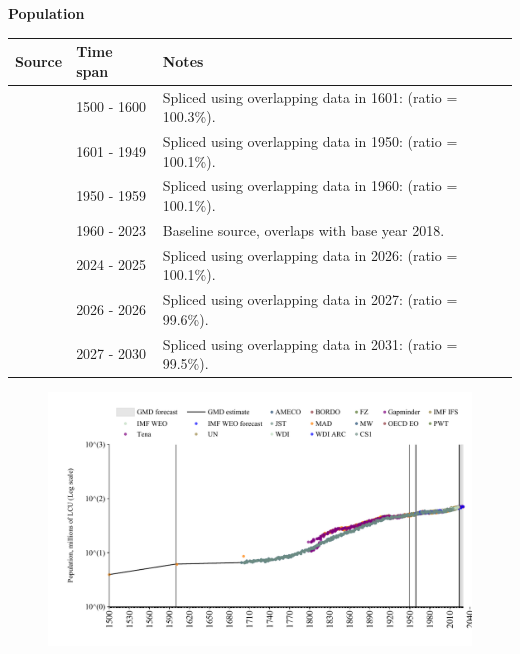 \documentclass[12pt,a4paper,landscape]{article}
\begin{document}
\begin{adjustbox}{max totalsize={\paperwidth}{\paperheight},center}
\begin{minipage}[t][\textheight][t]{\textwidth}
\vspace*{0.5cm}
{}
\begin{center}
{\Large\bfseries Population}
\end{center}
\vspace{0.5cm}
\begin{table}[H]
\centering
\small
\begin{tabular}{|l|l|l|}
\hline
\textbf{Source} & \textbf{Time span} & \textbf{Notes} \\
\hline
\rowcolor{white}\cite{MAD}& 1500 - 1600 &Spliced using overlapping data in 1601: (ratio = 100.3\%). \\
\rowcolor{lightgray}\cite{CS1_GBR}& 1601 - 1949 &Spliced using overlapping data in 1950: (ratio = 100.1\%). \\
\rowcolor{white}\cite{IMF_IFS}& 1950 - 1959 &Spliced using overlapping data in 1960: (ratio = 100.1\%). \\
\rowcolor{lightgray}\cite{WDI}& 1960 - 2023 &Baseline source, overlaps with base year 2018. \\
\rowcolor{white}\cite{OECD_EO}& 2024 - 2025 &Spliced using overlapping data in 2026: (ratio = 100.1\%). \\
\rowcolor{lightgray}\cite{AMECO}& 2026 - 2026 &Spliced using overlapping data in 2027: (ratio = 99.6\%). \\
\rowcolor{white}\cite{Gapminder}& 2027 - 2030 &Spliced using overlapping data in 2031: (ratio = 99.5\%). \\
\hline
\end{tabular}
\end{table}
\begin{figure}[H]
\centering
\includegraphics[width=\textwidth,height=0.6\textheight,keepaspectratio]{graphs/GBR_pop.pdf}
\end{figure}
\end{minipage}
\end{adjustbox}
\end{document}
